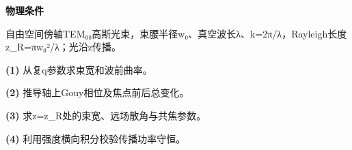 \textbf{物理条件}\par 自由空间傍轴TEM₀₀高斯光束，束腰半径w₀、真空波长λ、k=2π/λ，Rayleigh长度z\_R=πw₀²/λ；光沿z传播。
\par\noindent\textbf{(1)} 从复q参数求束宽和波前曲率。
\par\noindent\textbf{(2)} 推导轴上Gouy相位及焦点前后总变化。
\par\noindent\textbf{(3)} 求z=z\_R处的束宽、远场散角与共焦参数。
\par\noindent\textbf{(4)} 利用强度横向积分校验传播功率守恒。

